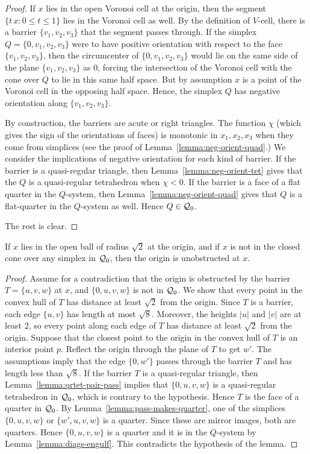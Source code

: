 \begin{proof}
If $x$ lies in the open Voronoi cell at the origin, then the
segment $\{t\, x : 0\le t \le 1\}$ lies in the Voronoi cell as
well. By the definition of $V$-cell, there is a barrier
$\{v_1,v_2,v_3\}$ that the segment passes through.  If the simplex
$Q=\{0,v_1,v_2,v_3\}$ were to have positive orientation with
respect to the face $\{v_1,v_2,v_3\}$, then the circumcenter of
$\{0,v_1,v_2,v_3\}$ would lie on the same side of the plane
$\{v_1,v_2,v_3\}$ as $0$, forcing the intersection of the Voronoi
cell with the cone over $Q$ to lie in this same half space. But by
assumption $x$ is a point of the Voronoi cell in the opposing half
space. Hence, the simplex $Q$ has negative orientation along
$\{v_1,v_2,v_3\}$.

By construction, the barriers are acute or right triangles.  The
function $\chi$ (which gives the sign of the orientations of
faces) is monotonic in $x_1,x_2,x_3$ when they come from simplices
(see the proof of Lemma~\ref{lemma:neg-orient-quad}.) We consider
the implications of negative orientation for each kind of barrier.
If the barrier is a quasi-regular triangle, then
Lemma~\ref{lemma:neg-orient-tet} gives that the $Q$ is a
quasi-regular tetrahedron when $\chi<0$. If the barrier is a face
of a flat quarter in the $Q$-system, then
Lemma~\ref{lemma:neg-orient-quad} gives that $Q$ is a flat-quarter
in the $Q$-system as well.  Hence $Q\in{\mathcal Q}_0$.

The rest is clear.
\end{proof}

\begin{lemma} \label{lemma:sqrt2-unobstructed}
If $x$ lies in the open ball of radius $\sqrt2$ at the origin, and
if $x$ is not in the closed cone over any simplex in ${\mathcal Q}_0$,
then the origin is unobstructed at $x$.
\end{lemma}

\begin{proof}
Assume for a contradiction that the origin is obstructed by the
barrier $T=\{u,v,w\}$ at $x$, and $\{0,u,v,w\}$ is not in
${\mathcal Q}_0$. We show that every point in the convex hull of $T$ has
distance at least $\sqrt2$ from the origin.  Since $T$ is a
barrier, each edge $\{u,v\}$ has length at most $\sqrt8$.
Moreover, the heights $|u|$ and $|v|$ are at least $2$, so every
point along each edge of $T$ has distance at least $\sqrt2$ from
the origin. Suppose that the closest point to the origin in the
convex hull of $T$ is an interior point $p$. Reflect the origin
through the plane of $T$ to get $w'$.  The assumptions imply that
the edge $\{0,w'\}$ passes through the barrier $T$ and has length
less than $\sqrt8$. If the barrier $T$ is a quasi-regular
triangle, then Lemma~\ref{lemma:qrtet-pair-pass} implies that
$\{0,u,v,w\}$ is a quasi-regular tetrahedron in ${\mathcal Q}_0$, which
is contrary to the hypothesis.  Hence $T$ is the face of a quarter
in ${\mathcal Q}_0$.  By Lemma~\ref{lemma:pass-makes-quarter}, one of the
simplices $\{0,u,v,w\}$ or $\{w',u,v,w\}$ is a quarter. Since
these are mirror images, both are quarters.  Hence $\{0,u,v,w\}$
is a quarter and it is in the $Q$-system by
Lemma~\ref{lemma:diags-engulf}.   This contradicts the hypothesis
of the lemma.
\end{proof}

